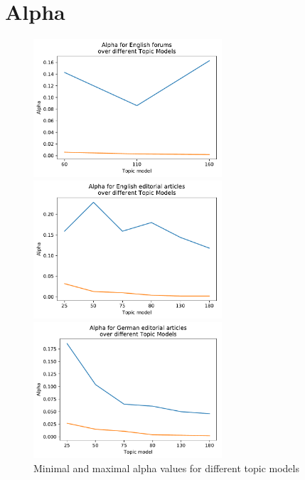 \section{Alpha}
\begin{figure}[t]
	\centering
	\includegraphics[width=7cm]{gfx/Eval_IC/English_forums_Alpha.pdf}\par\medskip
	\begin{minipage}{0.5\textwidth}
		\centering
		\includegraphics[width=7cm]{gfx/Eval_IC/English_Editorial_Alpha.pdf}
	\end{minipage}%
	\begin{minipage}{0.5\textwidth}
		\centering
		\includegraphics[width=7cm]{gfx/Eval_IC/German_Editorial_Alpha.pdf}
	\end{minipage}
	\caption[]{Minimal and maximal alpha values for different topic models}
\end{figure}


